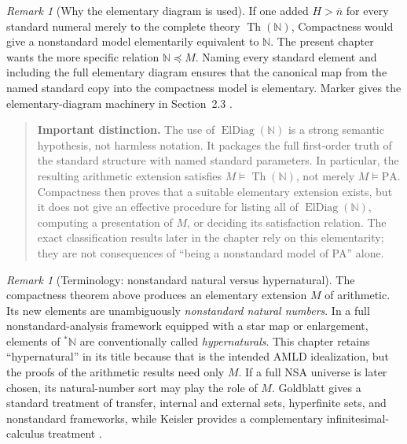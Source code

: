 \documentclass[11pt,openany]{book}
\theoremstyle{definition}
\theoremstyle{remark}
\newtheorem{remark}[theorem]{Remark}
\newenvironment{warningbox}{\begin{quote}\small\color{red!50!black}\textbf{Important distinction.} }{\end{quote}}
\newcommand{\N}{\mathbb{N}}
\begin{document}
\begin{remark}[Why the elementary diagram is used]\label{rem:eldiag}
If one added \(H>\overline n\) for every standard numeral merely to the complete theory \(\operatorname{Th}(\N)\), Compactness would give a nonstandard model elementarily equivalent to \(\N\). The present chapter wants the more specific relation \(\N\preccurlyeq M\). Naming every standard element and including the full elementary diagram ensures that the canonical map from the named standard copy into the compactness model is elementary. Marker gives the elementary-diagram machinery in Section~2.3 \cite{MarkerModelTheory}.
\end{remark}

\begin{warningbox}
The use of \(\operatorname{ElDiag}(\N)\) is a strong semantic hypothesis, not harmless notation. It packages the full first-order truth of the standard structure with named standard parameters. In particular, the resulting arithmetic extension satisfies \(M\models\operatorname{Th}(\N)\), not merely \(M\models\mathrm{PA}\). Compactness then proves that a suitable elementary extension exists, but it does not give an effective procedure for listing all of \(\operatorname{ElDiag}(\N)\), computing a presentation of \(M\), or deciding its satisfaction relation. The exact classification results later in the chapter rely on this elementarity; they are not consequences of ``being a nonstandard model of PA'' alone.
\end{warningbox}

\begin{remark}[Terminology: nonstandard natural versus hypernatural]\label{rem:hypernatural-terminology}
The compactness theorem above produces an elementary extension \(M\) of arithmetic. Its new elements are unambiguously \emph{nonstandard natural numbers}. In a full nonstandard-analysis framework equipped with a star map or enlargement, elements of \({}^*\N\) are conventionally called \emph{hypernaturals}. This chapter retains ``hypernatural'' in its title because that is the intended AMLD idealization, but the proofs of the arithmetic results need only \(M\). If a full NSA universe is later chosen, its natural-number sort may play the role of \(M\). Goldblatt gives a standard treatment of transfer, internal and external sets, hyperfinite sets, and nonstandard frameworks, while Keisler provides a complementary infinitesimal-calculus treatment \cite{GoldblattHyperreals,KeislerFoundations}.
\end{remark}
\end{document}
